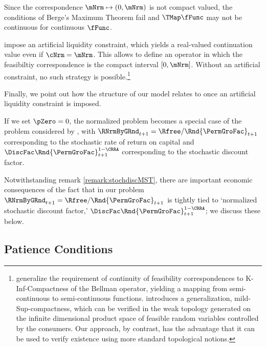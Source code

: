 \documentclass[BufferStockTheory]{subfiles}
\begin{document}
\begin{remark}\label{remark:notCompact}
Since the correspondence $\mNrm\mapsto (0, \mNrm)$ is not compact valued, the conditions of Berge's Maximum Theorem fail and $\TMap \fFunc$ may not be continuous for continuous $\fFunc$.
\end{remark}


\cite{Ma2022} impose an artificial liquidity constraint, which yields a real-valued continuation value even if $\cNrm= \mNrm$.
This allows \cite{Ma2022} to define an operator in which the feasibiltiy correspondence is the compact interval $[0, \mNrm]$.
Without an artificial constraint, no such strategy is possible.\footnote{\cite{Feinberg2012} generalize the requirement of continuity of feasibility correspondences to K-Inf-Compactness of the Bellman operator, yielding a mapping from semi-continuous to semi-continuous functions.
\cite{Shanker2017a} introduces a generalization, mild-Sup-compactness, which can be verified in the weak topology generated on the infinite dimensional product space of feasible random variables controlled by the consumers.
Our approach, by contrast, has the advantage that it can be used to verify existence using more standard topological notions.} 


Finally, we point out how the structure of our model relates to \cite{maUnboundedDP} once an artificial liquidity constraint is imposed.



\begin{remark}\label{remark:stochdiscMST}
If we set $\pZero=0$, the normalized problem becomes a special case of the problem considered by \cite{mstIncFluct}, with $\RNrmByGRnd_{t+1}=\Rfree/\Rnd{\PermGroFac}_{t+1}$ corresponding to the stochastic rate of return on capital and $\DiscFac \Rnd{\PermGroFac}_{t+1}^{1-\CRRA}$  corresponding to the stochastic discount factor.
\end{remark}

Notwithstanding remark \ref{remark:stochdiscMST},  there are important economic consequences of the fact that in our problem $\RNrmByGRnd_{t+1}=\Rfree/\Rnd{\PermGroFac}_{t+1}$ is tightly tied to `normalized stochastic discount factor,' $\DiscFac \Rnd{\PermGroFac}_{t+1}^{1-\CRRA}$; we discuss these below.

\hypertarget{GICTheorySetup}{}
\subsection{Patience Conditions}\label{subsec:GICTheorySetup}
\end{document}
